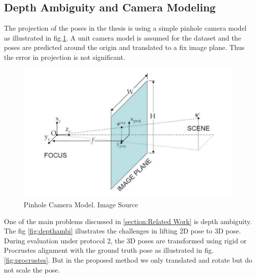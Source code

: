 \subsection{Depth Ambiguity and Camera Modeling}

The projection of the poses in the thesis is using a simple pinhole camera model as illustrated in fig.\ref{fig:pinhole}. A unit camera model is assumed for the dataset and the poses are predicted around the origin and translated to a fix image plane. Thus the error in projection is not significant. 

\begin{figure}[!h]
    \centering
    \includegraphics[scale=0.4]{figures/pinhole.png}
    \caption{Pinhole Camera Model. Image Source \cite{pinhole}}
    \label{fig:pinhole}
\end{figure}

One of the main problems discussed in \ref{section:Related Work} is depth ambiguity. The fig \ref{fig:depthambi} illustrates the challenges in lifting 2D pose to 3D pose. During evaluation under protocol 2, the 3D poses are transformed using rigid or Procrustes alignment with the ground truth pose as illustrated in fig. \ref{fig:procrustes}. But in the proposed method we only translated and rotate but do not scale the pose.





